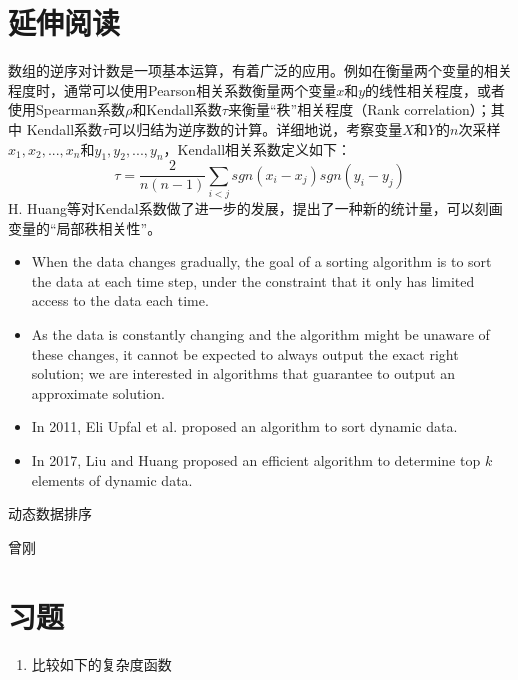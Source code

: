 \section*{延伸阅读}


数组的逆序对计数是一项基本运算，有着广泛的应用。例如在衡量两个变量的相关程度时，通常可以使用Pearson相关系数衡量两个变量$x$和$y$的线性相关程度，或者使用Spearman系数$\rho$和Kendall系数$\tau$来衡量“秩”相关程度（Rank correlation）；其中 Kendall系数$\tau$可以归结为逆序数的计算\cite{Kendall1938}。详细地说，考察变量$X$和$Y$的$n$次采样$x_1, x_2, ..., x_n$和$y_1, y_2, ..., y_n$，Kendall相关系数定义如下：
 \[
 	\tau = \frac{2}{n(n-1)} \sum_{i < j} sgn(x_i - x_j ) sgn(y_i - y_j)
 \]
H. Huang等对Kendal系数做了进一步的发展，提出了一种新的统计量，可以刻画变量的“局部秩相关性”\cite{Huang2014PNAS}。


	\begin{itemize}
	\item 
When the data changes gradually, the goal of a sorting algorithm is to sort the data at each time step, under the constraint that it only has limited access to the data each time.
\item As the data is constantly changing and the algorithm might be unaware of these changes, it cannot be expected to always output the exact right solution; we are interested in algorithms that guarantee to output an approximate solution.
\item In 2011, Eli Upfal et al. proposed an algorithm to sort dynamic data. 
\item In 2017, Liu and Huang proposed an efficient algorithm to determine top $k$ elements of dynamic data. 
\end{itemize} 


动态数据排序

曾刚
	
	
	
\section*{习题}	
\begin{enumerate}[1.]
	\item 比较如下的复杂度函数
\end{enumerate}	
		
